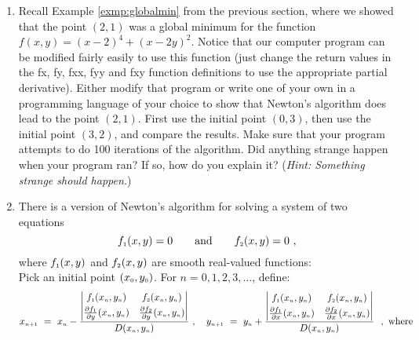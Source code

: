 \begin{enumerate}[\bfseries 1.]
 \item Recall Example \ref{exmp:globalmin} from the previous section, where we showed that the point $(2,1)$ was a
  global minimum for the function $f(x,y) = (x-2)^4 + (x-2y)^2$. Notice that our computer program can be modified
  fairly easily to use this function (just change the return values in the fx, fy, fxx, fyy and fxy
  function definitions to use the appropriate
  partial derivative). Either modify that program or write one of your own in a programming language of your
  choice to show that Newton's algorithm does lead to the point $(2,1)$. First use the initial point $(0,3)$, then use
  the initial point $(3,2)$, and compare the results. Make sure that your program attempts to do 100 iterations of the
  algorithm. Did anything strange happen when your program ran? If so, how do you explain it? (\emph{Hint: Something
  strange should happen.})
 \item There is a version of Newton's algorithm for solving a system of two equations
  \begin{displaymath}
   f_{\scriptscriptstyle 1}(x,y) = 0 \qquad\text{and}\qquad f_{\scriptscriptstyle 2}(x,y) = 0 ~,
  \end{displaymath}
  where $f_{\scriptscriptstyle 1}(x,y)$ and $f_{\scriptscriptstyle 2}(x,y)$ are smooth real-valued functions:\\
  Pick an initial point $(x_{\scriptscriptstyle 0},y_{\scriptscriptstyle 0})$. For $n = 0, 1, 2, 3, \dots$, define:
  \begin{gather*}
   \ssub{x}{n+1} ~=~ \ssub{x}{n} -
   \frac{
    \begin{vmatrix}
     \ssub{f}{1}(\ssub{x}{n},\ssub{y}{n}) &
     \ssub{f}{2}(\ssub{x}{n},\ssub{y}{n})\vspace{1mm}\\
     \frac{\partial \ssub{f}{1}}{\partial y}(\ssub{x}{n},\ssub{y}{n}) &
     \frac{\partial \ssub{f}{2}}{\partial y}(\ssub{x}{n},\ssub{y}{n})
    \end{vmatrix}}{D(\ssub{x}{n},\ssub{y}{n})} ~,\quad
   \ssub{y}{n+1} ~=~ \ssub{y}{n} +
   \frac{
    \begin{vmatrix}
     \ssub{f}{1}(\ssub{x}{n},\ssub{y}{n}) &
     \ssub{f}{2}(\ssub{x}{n},\ssub{y}{n})\vspace{1mm}\\
     \frac{\partial \ssub{f}{1}}{\partial x}(\ssub{x}{n},\ssub{y}{n}) &
     \frac{\partial \ssub{f}{2}}{\partial x}(\ssub{x}{n},\ssub{y}{n})
    \end{vmatrix}}{D(\ssub{x}{n},\ssub{y}{n})} ~~,~\text{where}\\[6pt]

\end{gather*}
\end{enumerate}
